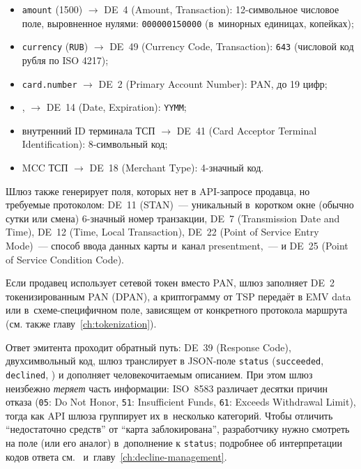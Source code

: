 \begin{itemize}
  \item \texttt{amount} (1500) $\to$ DE~4 (Amount, Transaction):
    12-символьное числовое поле, выровненное нулями:
    \texttt{000000150000} (в~минорных единицах, копейках);
  \item \texttt{currency} (\texttt{RUB}) $\to$ DE~49 (Currency Code,
    Transaction): \texttt{643} (числовой код рубля по ISO 4217);
  \item \texttt{card.number} $\to$ DE~2 (Primary Account Number):
    PAN, до 19 цифр;
  \item {},  $\to$
    DE~14 (Date, Expiration): \texttt{YYMM};
  \item внутренний ID терминала ТСП $\to$ DE~41 (Card Acceptor
    Terminal Identification): 8-символьный код;
  \item MCC ТСП $\to$ DE~18 (Merchant Type): 4-значный код.
\end{itemize}
Шлюз также генерирует поля, которых нет в API-запросе
продавца, но требуемые протоколом: DE~11 (STAN)~---
уникальный в~коротком окне (обычно сутки или смена) 6-значный
номер транзакции, DE~7 (Transmission Date
and Time), DE~12 (Time, Local Transaction), DE~22 (Point
of Service Entry Mode)~--- способ ввода данных карты
и~канал presentment,~--- и DE~25 (Point of Service Condition Code).

Если продавец использует сетевой токен вместо PAN, шлюз заполняет
DE~2 токенизированным PAN (DPAN), а криптограмму от TSP
передаёт в EMV data или в~схеме-специфичном поле, зависящем
от конкретного протокола маршрута~\cite{emvco-payment-tokenisation-guide}
(см. также главу~\ref{ch:tokenization}).

Ответ эмитента проходит обратный путь: DE~39 (Response Code),
двухсимвольный код, шлюз транслирует в JSON-поле
\texttt{status} (\texttt{succeeded}, \texttt{declined},
) и дополняет человекочитаемым
описанием. При этом шлюз неизбежно \emph{теряет} часть
информации: ISO~8583 различает десятки причин отказа (\texttt{05}:
  Do Not Honor, \texttt{51}: Insufficient Funds, \texttt{61}: Exceeds
Withdrawal Limit), тогда как API шлюза группирует их
в~несколько категорий. Чтобы отличить
\enquote{недостаточно средств} от \enquote{карта заблокирована},
разработчику нужно смотреть на поле 
(или его аналог) в~дополнение к \texttt{status};
подробнее об интерпретации кодов ответа см.~\cite{mc-tpr}
и~главу~\ref{ch:decline-management}.


